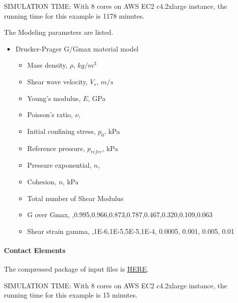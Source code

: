 SIMULATION TIME: With 8 cores on AWS EC2 c4.2xlarge instance, the running time for this example is 1178 minutes.

The Modeling parameters are listed.
\begin{itemize}
  \item Drucker-Prager G/Gmax material model 
  \begin{itemize}
    \item Mass density, $\rho$, \enspace {} $kg/m^3$
    \item Shear wave velocity, $V_s$, \enspace {} $m/s$
    \item Young's modulus, $E$, \enspace {} GPa
    \item Poisson's ratio, $\nu$, \enspace {}
    \item Initial confining stress, $p_0$, \enspace {} kPa
    \item Reference pressure, $p_{refer} $, \enspace {} kPa
    \item Pressure exponential, $ n  $, \enspace {}
    \item Cohesion, $ n  $, \enspace {} kPa
    \item Total number of Shear Modulus \enspace {}
    \item G over Gmax, \enspace {},0.995,0.966,0.873,0.787,0.467,0.320,0.109,0.063
    \item Shear strain gamma, \enspace {},1E-6,1E-5,5E-5,1E-4, 0.0005, 0.001, 0.005, 0.01
  \end{itemize}
\end{itemize}


\paragraph{Contact Elements}
The compressed package of input files is  
\href{http://sokocalo.engr.ucdavis.edu/~jeremic/Real_ESSI_Simulator/Real_ESSI_Short_Course_Examples_Dec2017/short-course-examples/nonlinear_analysis_steps/soil-structure/contact/_all_files_packaged_for_contact.tar.gz}{HERE}. 

SIMULATION TIME: With 8 cores on AWS EC2 c4.2xlarge instance, the running time for this example is 15 minutes.

